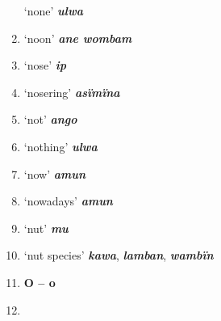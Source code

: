 \begin{enumerate}[noitemsep, label={}, align=left, widest=190, labelsep=1ex,leftmargin=*,itemindent=-10pt]
‘none’ \textbf{\textit{ulwa}} \item
‘noon’ \textbf{\textit{ane wombam}} \item
‘nose’ \textbf{\textit{ip}} \item
‘nosering’ \textbf{\textit{asïmïna}} \item
‘not’ \textbf{\textit{ango}} \item
‘nothing’ \textbf{\textit{ulwa}} \item
‘now’ \textbf{\textit{amun}} \item
‘nowadays’ \textbf{\textit{amun}} \item
‘nut’ \textbf{\textit{mu}} \item
‘nut species’ \textbf{\textit{kawa}}, \textbf{\textit{lamban}}, \textbf{\textit{wambïn}}\\ \item

\noindent \textbf{O – o}\\ \item


\end{enumerate}
